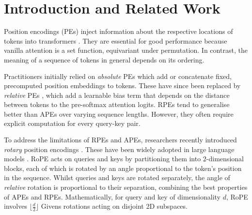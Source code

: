 \section{Introduction and Related Work}
\label{sec:intro_related}
Position encodings (PEs) \citep{pes-survey, pes-length-gen, pos-encoding-diet, kiyono-etal-2021-shape} inject information about the respective locations of tokens into transformers \citep{vaswani2017attention}. 
They are essential for good performance because vanilla attention is a set function, equivariant under permutation.
In contrast, the meaning of a sequence of tokens in general depends on its ordering. %

 Practitioners initially relied on \textit{absolute} PEs
\citep[APEs;][]{vaswani2017attention, kiyono-etal-2021-shape, WangSLJYLS21, LiuYDH20} which add or concatenate fixed, precomputed position embeddings to tokens.
These have since been replaced by \emph{relative} PEs \citep[RPEs;][]{shaw2018self, RaffelSRLNMZLL20, LiYGAOZSYKB24, ChiFRR22, PressSL22, ChiFRR23}, which add a learnable bias term that depends on the distance between tokens to the pre-softmax attention logits.
RPEs tend to generalise better than APEs over varying sequence lengths.
However, they often require explicit computation for every query-key pair. %


 To address the limitations of RPEs and APEs, researchers recently introduced \emph{rotary} position encodings \citep[RoPE;][]{su2024roformer, heo2025rotary}.
These have been widely adopted in large language models \citep[LLMs;][]{dubey2024llama,team2024gemma}.
RoPE acts on queries and keys by partitioning them into $2$-dimensional blocks, each of which is rotated by an angle proportional to the token's position in the sequence.
Whilst queries and keys are rotated separately, the angle of \emph{relative} rotation is proportional to their separation, combining the best properties of APEs and RPEs.
Mathematically, for query and key of dimensionality $d$, RoPE involves $\lfloor \frac{d}{2} \rfloor$ Givens rotations \citep{BindelDKM02} acting on disjoint 2D subspaces.


